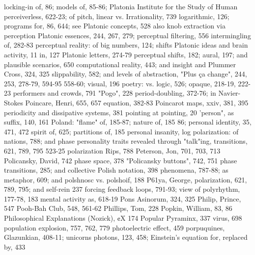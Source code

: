   locking-in of, 86; models of, 85-86;            Platonia Institute for the Study of Human
  perceiverless, 622-23; of pitch, linear vs.      Irrationality, 739
  logarithmic, 126; programs for, 86, 644; see    Platonic concepts, 528
  also knob extraction via perception             Platonic essences, 244, 267, 279;
perceptual filtering, 556                          intermingling of, 282-83
perceptual reality: of big numbers, 124; shifts   Platonic ideas and brain activity, 11
  in, 127                                         Platonic letters, 274-79
perceptual shifts, 182; aural, 197; and           plausible scenarios, 650
  computational reality, 443; and insight and     Plummer Cross, 324, 325
  slippability, 582; and levels of abstraction,   "Plus ça change", 244, 253, 278-79, 594-95
  558-60; visual, 196                             poetry: vs. logic, 526; opaque, 218-19, 222-23
performers and crowds, 791                        "Pogo", 228
period-doubling, 372-76; in Navier-Stokes         Poincare, Henri, 655, 657
  equation, 382-83                                Poincarot maps, xxiv, 381, 395
periodicity and dissipative systems, 381          pointing at pointing, 20
'person", as suffix, 140, 161                     Poland: "flame" of, 185-87; nature of, 185 86;
personal identity, 35, 471, 472                    spirit of, 625; partitions of, 185
personal insanity, log                            polarization: of nations, 788; and phase
personality traits revealed through "talk"ing,     transitions, 621, 789, 795
  523-25                                          polarization Rips, 788
Peterson, Jon, 701, 703, 713                      Policansky, David, 742
phase space, 378                                  "Policansky buttons", 742, 751
phase transitions, 285; and collective            Polish notation, 398
  phenomena, 787-88; as metaphor, 609; and        polshnosc vs. polshoif, 188 P61ya, George,
  polarization, 621, 789, 795; and self-rein       237
  forcing feedback loops, 791-93; view of         polyrhythm, 177-78, 183
  mental activity as, 618-19                      Pons Asinorum, 324, 325
Philip, Prince, 547                               Pooh-Bah Club, 548, 561-62
Phillips, Tom, 228                                Popkin, William, 83, 86
Philosophical Explanations (Nozick), ¢X 174       Popular Pyraminx, 337
  virus, 698                                      population explosion, 757, 762, 779
photoelectric effect, 459                         porpuquines, Glazunkian, 408-11; unicorns
photons, 123, 458; Einstein's equation for,        replaced by, 433
